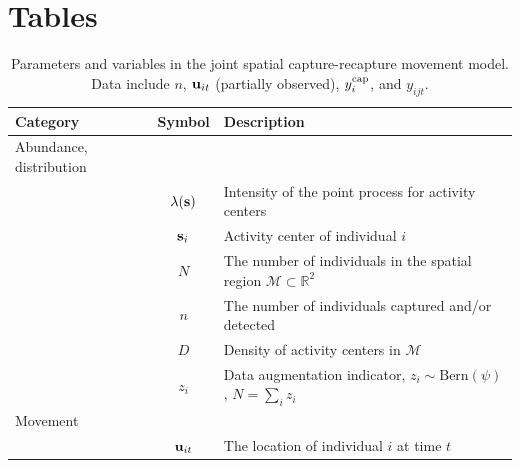 \documentclass[12pt]{article}
\newcommand{\bs}{{\bf s}}
\newcommand{\bsi}{{\bf s}_i}
\newcommand{\buit}{{\bf u}_{it}}
\begin{document}



\clearpage

\section*{Tables}


\begin{table}[h!]
  \caption{Parameters and variables in the joint spatial
    capture-recapture movement model. Data include $n$, $\buit$
    (partially observed), $y_i^{\rm cap}$, and $y_{ijt}$.}
  \begin{tabular}{p{3.5cm}cp{11cm}}
    \hline
    Category                & Symbol                    & Description                                                                       \\
    \hline
    Abundance, distribution &                           &                                                                                   \\
                            & $\lambda(\bs)$            & Intensity of the point process for activity centers                               \\
                            & $\bsi$                    & Activity center of individual $i$                                                 \\
                            & $N$                       & The number of individuals in the spatial region $\mathcal M \subset \mathbb{R}^2$ \\
                            & $n$                       & The number of individuals captured and/or detected                                \\
                            & $D$                       & Density of activity centers in $\mathcal M$                                       \\
                            & $z_i$                     & Data augmentation indicator, $z_i \sim \mathrm{Bern}(\psi)$, $N=\sum_i z_i$       \\
    Movement                &                           &                                                                                   \\
                            & $\buit$                   & The location of individual $i$ at time $t$                                        \\

\end{tabular}
\end{table}
\end{document}

